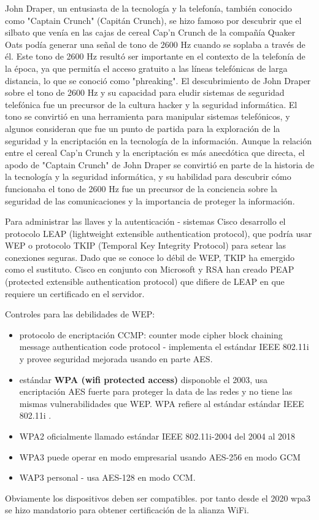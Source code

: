 \begin{tcolorbox}[colback=gray!5!white,colframe=orange!60!gray,title=Historia - década de 1970] 
John Draper, un entusiasta de la tecnología y la telefonía, también conocido como "Captain Crunch" (Capitán Crunch), se hizo famoso por descubrir que el silbato que venía en las cajas de cereal Cap'n Crunch de la compañía Quaker Oats podía generar una señal de tono de 2600 Hz cuando se soplaba a través de él. Este tono de 2600 Hz resultó ser importante en el contexto de la telefonía de la época, ya que permitía el acceso gratuito a las líneas telefónicas de larga distancia, lo que se conoció como "phreaking".
El descubrimiento de John Draper sobre el tono de 2600 Hz y su capacidad para eludir sistemas de seguridad telefónica fue un precursor de la cultura hacker y la seguridad informática. El tono se convirtió en una herramienta para manipular sistemas telefónicos, y algunos consideran que fue un punto de partida para la exploración de la seguridad y la encriptación en la tecnología de la información.
Aunque la relación entre el cereal Cap'n Crunch y la encriptación es más anecdótica que directa, el apodo de "Captain Crunch" de John Draper se convirtió en parte de la historia de la tecnología y la seguridad informática, y su habilidad para descubrir cómo funcionaba el tono de 2600 Hz fue un precursor de la conciencia sobre la seguridad de las comunicaciones y la importancia de proteger la información.
\end{tcolorbox}


Para administrar las llaves y la autenticación - sistemas Cisco desarrollo el protocolo  LEAP (lightweight extensible authentication protocol), que podría usar WEP o  protocolo TKIP (Temporal Key Integrity Protocol) para setear las conexiones seguras. Dado que se conoce lo débil de WEP, TKIP ha emergido como el sustituto. Cisco en conjunto con Microsoft y RSA han creado PEAP (protected extensible authentication protocol) que difiere de LEAP en que requiere un certificado en el servidor. 

Controles para las debilidades de WEP:
\begin{itemize}
    \item protocolo de encriptación  CCMP: counter mode cipher block chaining message authentication code protocol - implementa el estándar IEEE 802.11i y provee seguridad mejorada usando en parte AES. 
    \item estándar \textbf{WPA (wifi protected access) } disponoble el 2003, usa encriptación AES fuerte para proteger la data de las redes y no tiene las mismas vulnerabilidades que WEP. WPA refiere al estándar estándar IEEE 802.11i .
    \item WPA2 oficialmente llamado estándar IEEE 802.11i-2004 del 2004 al 2018
    \item WPA3 puede operar en modo empresarial usando AES-256 en modo GCM
    \item WAP3 personal - usa AES-128 en modo CCM. 
\end{itemize}
Obviamente los dispositivos deben ser compatibles. por tanto desde el 2020 wpa3 se hizo mandatorio para obtener certificación de la alianza WiFi. 

